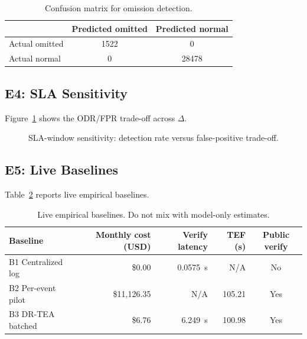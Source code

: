 \documentclass[journal]{IEEEtran}
\begin{document}
\begin{table}[!t]
\centering
\caption{Confusion matrix for omission detection.}
\label{tab:confusion}
\small
\begin{tabular}{@{}l c c@{}}
\toprule
 & \textbf{Predicted omitted} & \textbf{Predicted normal} \\
\midrule
Actual omitted & 1522 & 0 \\
Actual normal & 0 & 28478 \\
\bottomrule
\end{tabular}
\end{table}

\subsection{E4: SLA Sensitivity}
Figure~\ref{fig:sla} shows the ODR/FPR trade-off across $\Delta$.

\begin{figure}[!t]
\centering
{}
\caption{SLA-window sensitivity: detection rate versus false-positive trade-off.}
\label{fig:sla}
\end{figure}

\subsection{E5: Live Baselines}
Table~\ref{tab:live-baselines} reports live empirical baselines.

\begin{table}[!t]
\centering
\caption{Live empirical baselines. Do not mix with model-only estimates.}
\label{tab:live-baselines}
\small
\begin{tabular}{@{}l r r r c@{}}
\toprule
Baseline & Monthly cost (USD) & Verify latency & TEF (s) & Public verify \\
\midrule
B1 Centralized log & \$0.00 & 0.0575~\textmu{}s & N/A & No \\
B2 Per-event pilot & \$11{,}126.35 & N/A & 105.21 & Yes \\
B3 DR-TEA batched & \$6.76 & 6.249~\textmu{}s & 100.98 & Yes \\
\bottomrule
\end{tabular}
\end{table}
\end{document}
